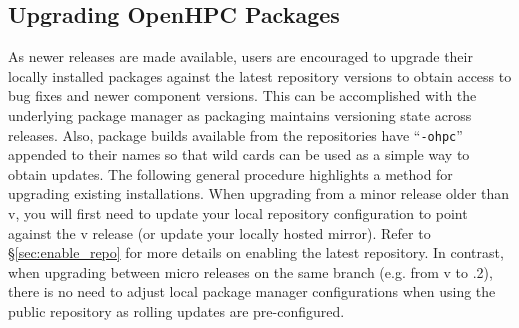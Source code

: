 \subsection{Upgrading OpenHPC Packages}  \label{appendix:upgrade}


As newer \OHPC{} releases are made available, users are encouraged to upgrade
their locally installed packages against the latest repository versions to
obtain access to bug fixes and newer component versions. This can be
accomplished with the underlying package manager as \OHPC{} packaging maintains
versioning state across releases. Also, package builds available from the
\OHPC{} repositories have ``\texttt{-ohpc}'' appended to their names so that
wild cards can be used as a simple way to obtain updates. The following general
procedure highlights a method for upgrading existing installations.
When upgrading from a minor release older than v\OHPCVerTree{}, you will first
need to update your local \OHPC{} repository configuration to point against the
v\OHPCVerTree{} release (or update your locally hosted mirror). Refer to
\S\ref{sec:enable_repo} for more details on enabling the latest
repository. In contrast, when upgrading between micro releases on the same
branch (e.g. from v\OHPCVerTree{} to \OHPCVerTree{}.2), there is no need to
adjust local package manager configurations when using the public repository as
rolling updates are pre-configured.
 
